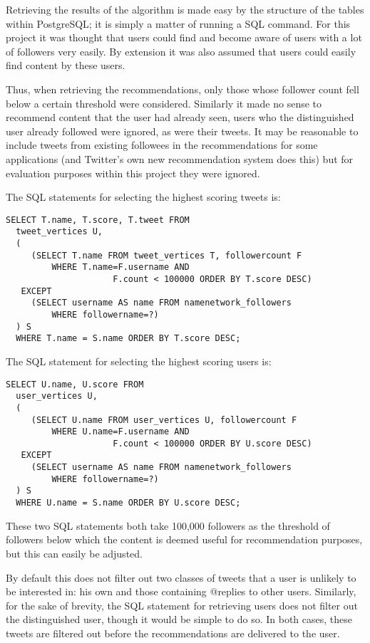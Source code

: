 Retrieving the results of the algorithm is made easy by the structure of the tables within PostgreSQL; it is simply a matter of running a SQL command. For this project it was thought that users could find and become aware of users with a lot of followers very easily. By extension it was also assumed that users could easily find content by these users.

Thus, when retrieving the recommendations, only those whose follower count fell below a certain threshold were considered. Similarly it made no sense to recommend content that the user had already seen, users who the distinguished user already followed were ignored, as were their tweets. It may be reasonable to include tweets from existing followees in the recommendations for some applications (and Twitter's own new recommendation system does this) but for evaluation purposes within this project they were ignored.

The SQL statements for selecting the highest scoring tweets is:

\begin{verbatim}
SELECT T.name, T.score, T.tweet FROM
  tweet_vertices U,
  (
     (SELECT T.name FROM tweet_vertices T, followercount F
         WHERE T.name=F.username AND
                     F.count < 100000 ORDER BY T.score DESC)
   EXCEPT
     (SELECT username AS name FROM namenetwork_followers
         WHERE followername=?)
  ) S
  WHERE T.name = S.name ORDER BY T.score DESC;
\end{verbatim}

\noindent
The SQL statement for selecting the highest scoring users is:

\begin{verbatim}
SELECT U.name, U.score FROM
  user_vertices U,
  (
     (SELECT U.name FROM user_vertices U, followercount F
         WHERE U.name=F.username AND
                     F.count < 100000 ORDER BY U.score DESC)
   EXCEPT
     (SELECT username AS name FROM namenetwork_followers
         WHERE followername=?)
  ) S
  WHERE U.name = S.name ORDER BY U.score DESC;
\end{verbatim}

\noindent
These two SQL statements both take 100,000 followers as the threshold of followers below which the content is deemed useful for recommendation purposes, but this can easily be adjusted.

By default this does not filter out two classes of tweets that a user is unlikely to be interested in: his own and those containing @replies to other users. Similarly, for the sake of brevity, the SQL statement for retrieving users does not filter out the distinguished user, though it would be simple to do so. In both cases, these tweets are filtered out before the recommendations are delivered to the user.



